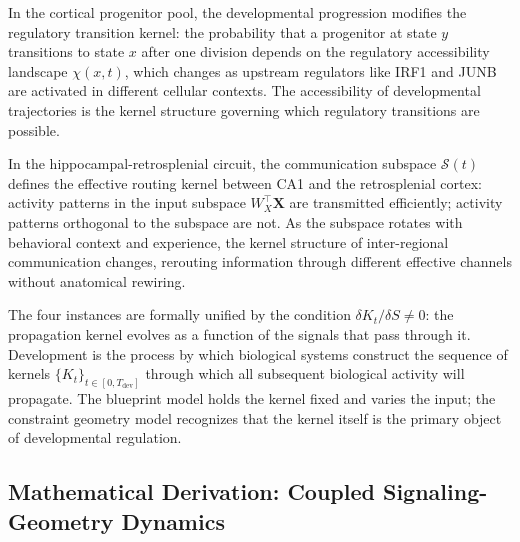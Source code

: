 \documentclass[12pt, a4paper, openany]{book}
\theoremstyle{definition}
\theoremstyle{remark}
\begin{document}
In the cortical progenitor pool, the developmental progression modifies the regulatory transition kernel: the probability that a progenitor at state $y$ transitions to state $x$ after one division depends on the regulatory accessibility landscape $\chi(x,t)$, which changes as upstream regulators like IRF1 and JUNB are activated in different cellular contexts. The accessibility of developmental trajectories is the kernel structure governing which regulatory transitions are possible.

In the hippocampal-retrosplenial circuit, the communication subspace $\mathcal{S}(t)$ defines the effective routing kernel between CA1 and the retrosplenial cortex: activity patterns in the input subspace $W_X^\top \mathbf{X}$ are transmitted efficiently; activity patterns orthogonal to the subspace are not. As the subspace rotates with behavioral context and experience, the kernel structure of inter-regional communication changes, rerouting information through different effective channels without anatomical rewiring.

The four instances are formally unified by the condition $\delta K_t / \delta S \neq 0$: the propagation kernel evolves as a function of the signals that pass through it. Development is the process by which biological systems construct the sequence of kernels $\{K_t\}_{t \in [0,T_{\mathrm{dev}}]}$ through which all subsequent biological activity will propagate. The blueprint model holds the kernel fixed and varies the input; the constraint geometry model recognizes that the kernel itself is the primary object of developmental regulation.

\subsection*{Mathematical Derivation: Coupled Signaling-Geometry Dynamics}
\end{document}
